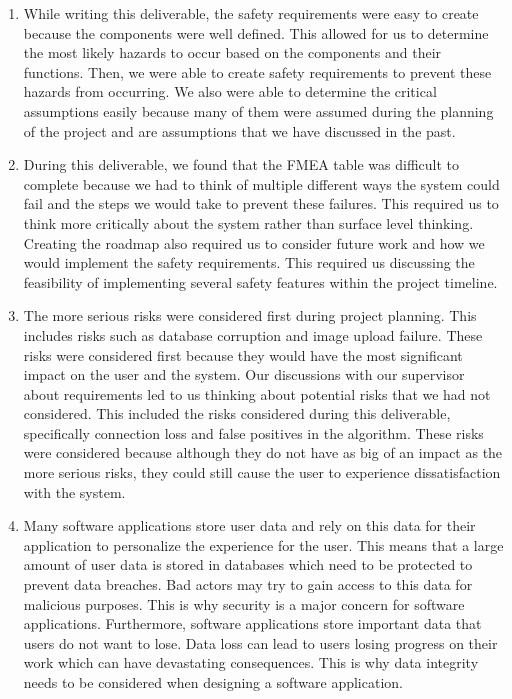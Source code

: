 \documentclass{article}
\begin{document}
\begin{enumerate}
    \item While writing this deliverable, the safety requirements were easy to create because the components were well defined. This allowed for us to determine the most likely hazards to occur based on the
    components and their functions. Then, we were able to create safety requirements to prevent these hazards from occurring. We also were able to determine the critical assumptions easily because many of
    them were assumed during the planning of the project and are assumptions that we have discussed in the past.
    \item During this deliverable, we found that the FMEA table was difficult to complete because we had to think of multiple different ways the system could fail and the steps we would take to prevent these failures. This
    required us to think more critically about the system rather than surface level thinking. Creating the roadmap also required us to consider future work and how we would implement the safety requirements. This required us
    discussing the feasibility of implementing several safety features within the project timeline.
    \item The more serious risks were considered first during project planning. This includes risks such as database corruption and image upload failure. These risks were considered first because they would have the most
    significant impact on the user and the system. Our discussions with our supervisor about requirements led to us thinking about potential risks that we had not considered. This included the risks considered 
    during this deliverable, specifically connection loss and false positives in the algorithm. These risks were considered because although they do not have as big of an impact as the more serious risks, they 
    could still cause the user to experience dissatisfaction with the system. 
    \item Many software applications store user data and rely on this data for their application to personalize the experience for the user. This means that a large amount of user data is stored in databases which need to
    be protected to prevent data breaches. Bad actors may try to gain access to this data for malicious purposes. This is why security is a major concern for software applications. Furthermore, software applications store
    important data that users do not want to lose. Data loss can lead to users losing progress on their work which can have devastating consequences. This is why data integrity needs to be considered when designing a 
    software application. 
\end{enumerate}
\end{document}
